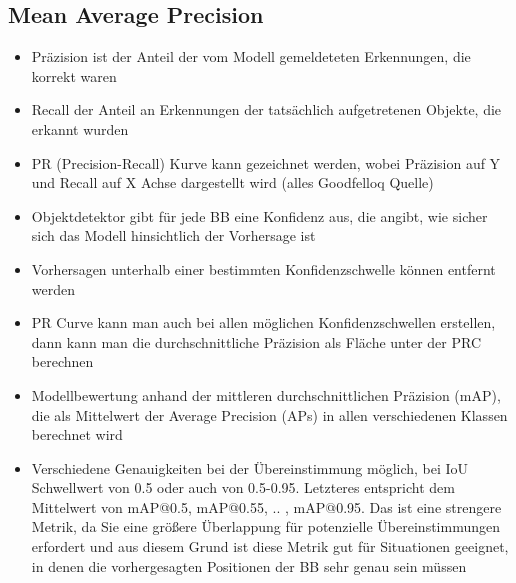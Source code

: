 \subsection{Mean Average Precision}
\begin{itemize}
    \item Präzision ist der Anteil der vom Modell gemeldeteten Erkennungen, die korrekt waren 
    \item Recall der Anteil an Erkennungen der tatsächlich aufgetretenen Objekte, die erkannt wurden
    \item PR (Precision-Recall) Kurve kann gezeichnet werden, wobei Präzision auf Y und Recall auf X Achse dargestellt wird (alles Goodfelloq Quelle)
    \item Objektdetektor gibt für jede BB eine Konfidenz aus, die angibt, wie sicher sich das Modell hinsichtlich der Vorhersage ist
    \item Vorhersagen unterhalb einer bestimmten Konfidenzschwelle können entfernt werden
    \item PR Curve kann man auch bei allen möglichen Konfidenzschwellen  erstellen, dann kann man die durchschnittliche Präzision als Fläche unter der PRC berechnen
    \item Modellbewertung anhand der mittleren durchschnittlichen Präzision (mAP), die als Mittelwert der Average Precision (APs) in allen verschiedenen Klassen berechnet wird \cite{Rainio2024}
    \item Verschiedene Genauigkeiten bei der Übereinstimmung möglich, bei IoU Schwellwert von 0.5 oder auch von 0.5-0.95. Letzteres entspricht dem Mittelwert von mAP@0.5, mAP@0.55, .. , mAP@0.95. Das ist eine strengere Metrik, da Sie eine größere Überlappung für potenzielle Übereinstimmungen erfordert und aus diesem Grund ist diese Metrik gut für Situationen geeignet, in denen die vorhergesagten Positionen der BB sehr genau sein müssen
\end{itemize}




